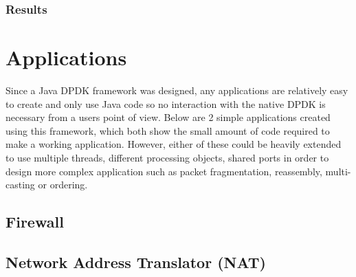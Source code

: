 \documentclass[final_report.tex]{subfiles}
\begin{document}
\subsubsection{Results}

\section{Applications}
\label{sec:apps}
Since a Java DPDK framework was designed, any applications are relatively easy to create and only use Java code so no interaction with the native DPDK is necessary from a users point of view. Below are 2 simple applications created using this framework, which both show the small amount of code required to make a working application. However, either of these could be heavily extended to use multiple threads, different processing objects, shared ports in order to design more complex application such as packet fragmentation, reassembly, multi-casting or ordering.

\subsection{Firewall}

\subsection{Network Address Translator (NAT)}
\end{document}
